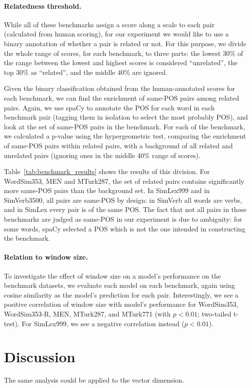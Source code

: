 \documentclass[11pt,a4paper]{article}
\begin{document}
    \paragraph{Relatedness threshold.}
    
    While all of these benchmarks assign a score along a scale to each pair
    (calculated from human scoring), for our experiment we would like to use
    a binary annotation of whether a pair is related or not.
    For this purpose, we divide the whole range of scores,
    for each benchmark, to three parts:
    the lowest 30\% of the range between the lowest and highest scores
    is considered ``unrelated'', the top 30\% as ``related'',
    and the middle 40\% are ignored.
    
    Given the binary classification obtained from the human-annotated scores
    for each benchmark, we can find the enrichment of same-POS pairs among
    related pairs.
    Again, we use spaCy to annotate the POS for each word in each benchmark
    pair (tagging them in isolation to select the most probably POS),
    and look at the set of same-POS pairs in the benchmark.
    For each of the benchmark, we calculated a p-value using the hypergeometric
    test, comparing the enrichment of same-POS pairs within related pairs,
    with a background of all related and unrelated pairs (ignoring ones in
    the middle 40\% range of scores).
    
    Table~\ref{tab:benchmark_results} shows the results of this division.
    For WordSim353, MEN and MTurk287, the set of related pairs
    contains significantly more same-POS pairs than the background set.
    In SimLex999 and in SimVerb3500, all pairs are same-POS by design:
    in SimVerb all words are verbs, and in SimLex every pair is of the same POS.
    The fact that not all pairs in these benchmarks are judged as same-POS
    in our experiment is due to ambiguity: for some words, spaCy selected a POS
    which is not the one intended in constructing the benchmark.
    
    \paragraph{Relation to window size.}
    
    To investigate the effect of window size on a model's performance on the benchmark
    datasets, we evaluate each model on each benchmark, again using cosine similarity
    as the model's prediction for each pair.
    Interestingly, we see a positive correlation of window size with model's performance
    for WordSim353, WordSim353-R, MEN, MTurk287, and MTurk771 (with $p<0.01$; two-tailed t-test).
    For SimLex999, we see a negative correlation instead ($p<0.01$).
    
    

\section{Discussion}\label{sec:discussion}

The same analysis could be applied to the vector dimension.

    
    
\end{document}
